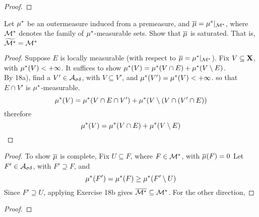 \documentclass[../../main.tex]{subfiles}
\begin{document}
%


\begin{wts}
    
\end{wts}
\begin{proof}
    
\end{proof}
\newpage

%


\begin{wts}
    Let $\mu^*$ be an outermeasure induced from a premeasure, and $\overline{\mu} = \mu^*|_{\mathcal{M}^*}$, where $\mathcal{M}^*$ denotes the family of $\mu^*$-measurable sets. Show that $\overline{\mu}$ is saturated. That is, $\widetilde{\mathcal{M}^*} = \mathcal{M}^*$
\end{wts}
\begin{proof}
    Suppose $E$ is locally measurable (with respect to $\overline{\mu} = \mu^*|_{\mathcal{M}^*}$). Fix $V\subseteq{\mathbf{X}}$, with $\mu^*(V)<+\infty$. It suffices to show $\mu^*(V) = \mu^*(V\cap E) + \mu^*(V\setminus E)$.\\

    By 18a), find a $V'\in\mathcal{A}_{\sigma\delta}$, with $V\subseteq V'$, and $\mu^*(V') = \mu^*(V) <  +\infty$. so that $E\cap V'$ is $\mu^*$-measurable. 
    \[
        \mu^*(V) = \mu^*(V\cap E\cap V') + \mu^*(V\setminus(V\cap(V'\cap E))
    \]
    therefore
    \[
        \mu^*(V) = \mu^*(V\cap E) + \mu^*(V\setminus E)
    \]
\end{proof}
\newpage


%


\begin{wts}
    
\end{wts}
\begin{proof}
    To show $\overline{\mu}$ is complete, Fix $U\subseteq F$, where $F\in\mathcal{M}^*$, with $\overline{\mu}(F) = 0$ Let $F'\in\mathcal{A}_{\sigma\delta}$, with $F'\supseteq F$, and 
    \[
        \mu^*(F') = \mu^*(F)\geq \mu^*(F'\setminus U)
    \]
    Since $F'\supseteq U$, applying Exercise 18b gives $\overline{\mathcal{M}^*}\subseteq\mathcal{M}^*$. For the other direction, 

    
\end{proof}
\newpage

%

\begin{wts}
    
\end{wts}
\begin{proof}
    
\end{proof}
\newpage
\end{document}
